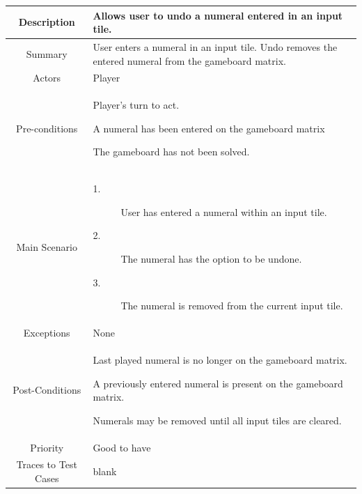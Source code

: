 \documentclass[12pt]{article}
\begin{document}
\begin{table}[htbp]
\begin{center}
\begin{tabular}{| c | m{10cm} |}
\hline
\cellcolor{lightgray}Description & Allows user to undo a numeral entered in an input tile. \\
\hline
\cellcolor{lightgray}Summary & User enters a numeral in an input tile. Undo removes the entered numeral from the gameboard matrix. \\
\hline
\cellcolor{lightgray}Actors & Player \\
\hline
\cellcolor{lightgray}Pre-conditions &
\begin{description}[font=$\bullet$~\normalfont\scshape]
\item Player's turn to act.
\item A numeral has been entered on the gameboard matrix 
\item The gameboard has not been solved.
\end{description}\\
\hline
\cellcolor{lightgray}Main Scenario & 
\begin{description}
\item [1.]User has entered a numeral within an input tile.
\item [2.]The numeral has the option to be undone.
\item [3.]The numeral is removed from the current input tile.
\end{description}\\
\hline
\cellcolor{lightgray}Exceptions & None \\
\hline
\cellcolor{lightgray}Post-Conditions & 
\begin{description}[font=$\bullet$~\normalfont\scshape]
\item Last played numeral is no longer on the gameboard matrix.
\item A previously entered numeral is present on the gameboard matrix.
\item Numerals may be removed until all input tiles are cleared.
\end{description}\\
\hline
\cellcolor{lightgray}Priority & Good to have \\
\hline
\cellcolor{lightgray}Traces to Test Cases & blank \\
\hline
\end{tabular}
\end{center}
\end{table}
\end{document}
